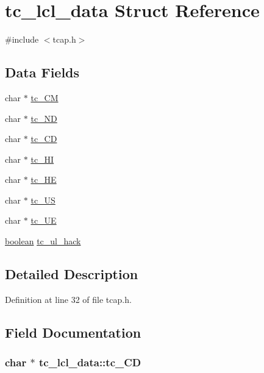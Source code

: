 \hypertarget{structtc__lcl__data}{\section{tc\+\_\+lcl\+\_\+data Struct Reference}
\label{structtc__lcl__data}
}


{\ttfamily \#include $<$tcap.\+h$>$}

\subsection*{Data Fields}
\begin{DoxyCompactItemize}
\item 
char $\ast$ \hyperlink{structtc__lcl__data_a604d0cb40e952c24c693786401d758bb}{tc\+\_\+\+C\+M}
\item 
char $\ast$ \hyperlink{structtc__lcl__data_a2b28cdf4f1499b47767b9b3b15452e41}{tc\+\_\+\+N\+D}
\item 
char $\ast$ \hyperlink{structtc__lcl__data_a1ad3b33afdd3277c7c3a86bcc1e21c30}{tc\+\_\+\+C\+D}
\item 
char $\ast$ \hyperlink{structtc__lcl__data_a1b77b204bf10795f7f5c46f60a5a5824}{tc\+\_\+\+H\+I}
\item 
char $\ast$ \hyperlink{structtc__lcl__data_a08b9b8011f478ffd1747b9d7d5e6abc5}{tc\+\_\+\+H\+E}
\item 
char $\ast$ \hyperlink{structtc__lcl__data_ac6d0dda0e3860679a976ef5054585cf8}{tc\+\_\+\+U\+S}
\item 
char $\ast$ \hyperlink{structtc__lcl__data_afad6682077dc6d6c82fa0b8d9b53f832}{tc\+\_\+\+U\+E}
\item 
\hyperlink{global_8h_a531b10dd351aa162d7dcccd1966308b8}{boolean} \hyperlink{structtc__lcl__data_aee5d807cd6b3ac43b7b9e91c5cda0006}{tc\+\_\+ul\+\_\+hack}
\end{DoxyCompactItemize}


\subsection{Detailed Description}


Definition at line 32 of file tcap.\+h.



\subsection{Field Documentation}
\hypertarget{structtc__lcl__data_a1ad3b33afdd3277c7c3a86bcc1e21c30}{
\subsubsection[{tc\+\_\+\+C\+D}]{\setlength{\rightskip}{0pt plus 5cm}char $\ast$ tc\+\_\+lcl\+\_\+data\+::tc\+\_\+\+C\+D}}\label{structtc__lcl__data_a1ad3b33afdd3277c7c3a86bcc1e21c30}


